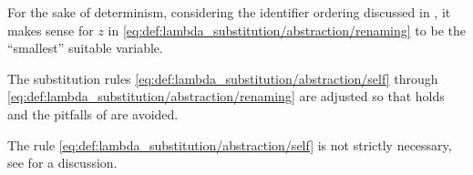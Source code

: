\begin{comments}
  \item For the sake of determinism, considering the identifier ordering discussed in , it makes sense for \( z \) in \eqref{eq:def:lambda_substitution/abstraction/renaming} to be the \enquote{smallest} suitable variable.

  \item The substitution rules \eqref{eq:def:lambda_substitution/abstraction/self} through \eqref{eq:def:lambda_substitution/abstraction/renaming} are adjusted so that  holds and the pitfalls of  are avoided.

  \item The rule \eqref{eq:def:lambda_substitution/abstraction/self} is not strictly necessary, see  for a discussion.
\end{comments}

